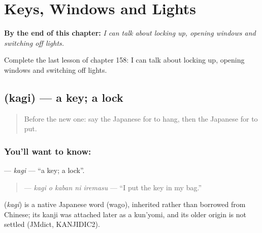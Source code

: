 
\chapter{Keys, Windows and Lights}
\label{ch:ja-keys-windows-and-lights}

\begin{chapteropening}
\textbf{By the end of this chapter:} \emph{I can talk about locking up, opening windows and switching off lights.}

Complete the last lesson of chapter 158: I can talk about locking up, opening windows and switching off lights.
\end{chapteropening}

\section[\texorpdfstring{\ja{かぎ} (kagi)}{かぎ (kagi)}]{ (kagi) — a key; a lock}

\label{lesson:JA-C158-kagi}



\begin{quote}
Before the new one: say the Japanese for to hang, then the Japanese for to put.
\end{quote}

\subsection*{You'll want to know: }
\textbf{} — \emph{kagi} — \textquotedblleft{}a key; a lock\textquotedblright{}.

\begin{quote}
\textbf{  } — \emph{kagi o kaban ni iremasu} — \textquotedblleft{}I put the key in my bag.\textquotedblright{}
\end{quote}

\begin{cousinweb}
\textbf{} (\emph{kagi}) is a native Japanese word (wago), inherited rather than borrowed from Chinese; its kanji was attached later as a kun'yomi, and its older origin is not settled (JMdict, KANJIDIC2).
\end{cousinweb}

